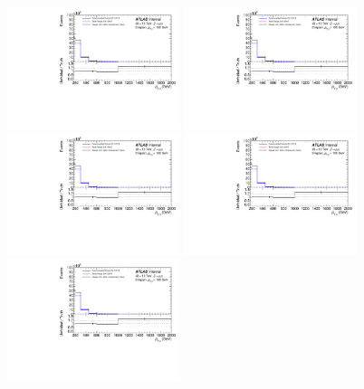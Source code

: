 \begin{figure}
  \centering
  \includegraphics[page=76,width=0.45\textwidth]{figures/IBUPlots.pdf}
  \includegraphics[page=77,width=0.45\textwidth]{figures/IBUPlots.pdf} \\
  \includegraphics[page=85,width=0.45\textwidth]{figures/IBUPlots.pdf}
  \includegraphics[page=92,width=0.45\textwidth]{figures/IBUPlots.pdf} \\
  \includegraphics[page=86,width=0.45\textwidth]{figures/IBUPlots.pdf}

\end{figure}
